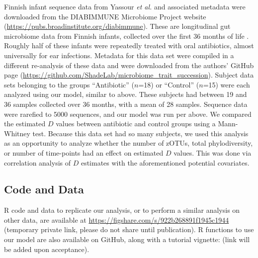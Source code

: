 \documentclass{article}
\begin{document}
Finnish infant sequence data from Yassour \emph{et al.} \cite{Yassour2016} and associated metadata were downloaded from the DIABIMMUNE Microbiome Project website (\url{https://pubs.broadinstitute.org/diabimmune}). These are longitudinal gut microbiome data from Finnish infants, collected over the first 36 months of life \cite{Yassour2016}. Roughly half of these infants were repeatedly treated with oral antibiotics, almost universally for ear infections. Metadata for this data set were compiled in a different re-analysis of these data \cite{Guittar2019} and were downloaded from the authors’ GitHub page (\url{https://github.com/ShadeLab/microbiome_trait_succession}). Subject data sets belonging to the groups “Antibiotic” (\(n\)=18) or “Control” (\(n\)=15) were each analyzed using our model, similar to above. These subjects had between 19 and 36 samples collected over 36 months, with a mean of 28 samples. Sequence data were rarefied to 5000 sequences, and our model was run per above. We compared the estimated \(D\) values between antibiotic and control groups using a Mann-Whitney test. Because this data set had so many subjects, we used this analysis as an opportunity to analyze whether the number of zOTUs, total phylodiversity, or number of time-points had an effect on estimated \(D\) values. This was done via correlation analysis of \(D\) estimates with the aforementioned potential covariates.

\subsection{Code and Data} \label{sec:codeAndData}
R code and data to replicate our analysis, or to perform a similar analysis on other data, are available at \url{https://figshare.com/s/922b268891f1945c1944} (temporary private link, please do not share until publication). R functions to use our model are also available on GitHub, along with a tutorial vignette: (link will be added upon acceptance).


\end{document}
